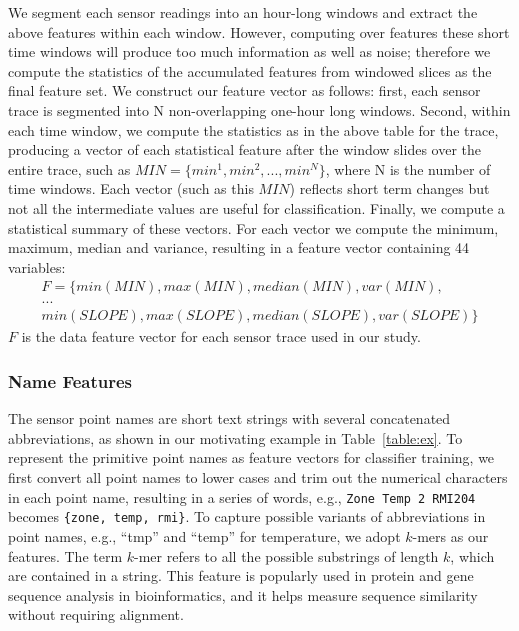 We segment each sensor readings into an hour-long windows and extract the above features within each window. 
However, computing over features these short time windows will produce too much information as well as noise; 
therefore we compute the statistics of the accumulated features from windowed slices as the final feature set. 
We construct our feature vector as follows: first, each sensor trace is segmented into N non-overlapping one-hour long windows. Second, within each time window, we compute the statistics as in the above table for the trace, producing a vector of each statistical feature after the window slides over the entire trace, such as 
$MIN = \{min^{1}, min^{2}, ..., min^{N}\}$, where N is the number of time windows. Each vector (such as this $MIN$) reflects short term changes but not all the intermediate values are useful for classification. 
Finally, we compute a statistical summary of these vectors. For each vector we compute the minimum, maximum, median and variance, resulting in a feature vector containing 44 variables:
\begin{displaymath}
\begin{split}
F = \{min(MIN), max(MIN), median(MIN), var(MIN),\\
...\\
min(SLOPE), max(SLOPE), median(SLOPE), var(SLOPE)\}
\end{split}
\end{displaymath}
$F$ is the data feature vector for each sensor trace used in our study.


\subsubsection{Name Features}
The sensor point names are short text strings with several concatenated abbreviations, as shown in our motivating example in Table~\ref{table:ex}. 
To represent the primitive point names as feature vectors for classifier training, we first convert all point names to lower cases and trim out the numerical characters in each point name, resulting in a series of words, e.g., \texttt{Zone Temp 2 RMI204} becomes \texttt{\{zone, temp, rmi\}}. 
To capture possible variants of abbreviations in point names, e.g., ``tmp'' and ``temp'' for temperature, we adopt $k$-mers \cite{leslie2004mismatch} as our features. 
The term $k$-mer refers to all the possible substrings of length $k$, which are contained in a string. This feature is popularly used in protein and gene sequence analysis in bioinformatics, and it helps measure sequence similarity without requiring alignment. 


